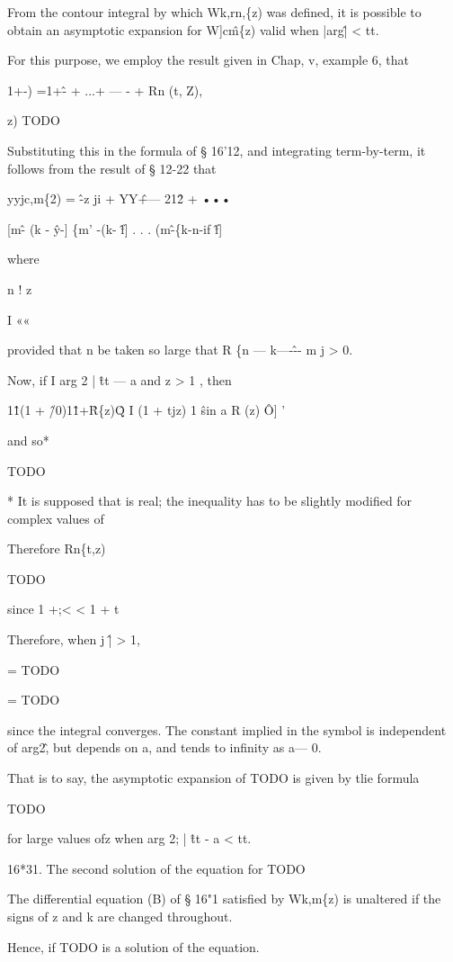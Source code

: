 From the contour integral by which Wk,rn,\{z) was defined, it is
possible to obtain an asymptotic expansion for W]c\^m\{z) valid when
|arg\^| < tt.

For this purpose, we employ the result given in Chap, v, example 6,
that

1+-) =1+\^- + ...+ — - + Rn (t, Z),

z) TODO

Substituting this in the formula of § 16'12, and integrating
term-by-term, it follows from the result of § 12-22 that

yyjc,m\{2) = \^ -z ji + YY\^ +— 21\^2 + •••

[m\^ - (k - \^y-] \{m' -(k- \^f] . . . (m\^ -\{k-n-if \^f]

where

n ! z

I ««

provided that n be taken so large that R \{n — k—-\^-- m j > 0.

Now, if I arg 2 | \^ tt — a and z > 1 , then

1\^1(1 + \^/0)1\^1+\^ R\{z)\^Q I (1 + tjz) 1 \^ sin a R (z) \^ O] '

and so*

TODO

* It is supposed that is real; the inequality has to be slightly
modified for complex values of

%
%

Therefore Rn\{t,z)

TODO

since 1 +;< < 1 + t

Therefore, when j \^ | > 1,

= TODO

= TODO

since the integral converges. The constant implied in the symbol is
independent of arg2\^, but depends on a, and tends to infinity as a—
0.

That is to say, the asymptotic expansion of TODO is given by tlie
formula

TODO

for large values ofz when arg 2; | \^ tt - a < tt.

16*31. The second solution of the equation for TODO

The differential equation (B) of § 16"1 satisfied by Wk,m\{z) is
unaltered if the signs of z and k are changed throughout.

Hence, if TODO is a solution of the equation.

